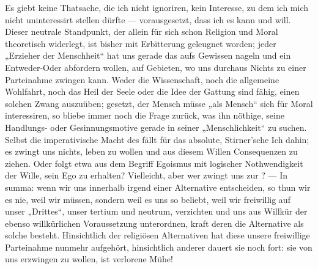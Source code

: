 Es giebt keine Thatsache, die ich nicht ignoriren, kein Interesse, zu dem ich mich nicht uninteressirt stellen dürfte — vorausgesetzt, dass ich es kann und will. Dieser neutrale Standpunkt, der allein für sich schon Religion und Moral theoretisch widerlegt, ist bisher mit Erbitterung geleugnet worden; jeder „Erzieher der Menschheit“ hat uns gerade das  aufs Gewissen nageln und ein Entweder-Oder abfordern wollen, auf Gebieten, wo uns durchaus Nichts zu einer Parteinahme zwingen kann. Weder die Wissenschaft, noch die allgemeine Wohlfahrt, noch das Heil der Seele oder die Idee der Gattung sind fähig, einen solchen Zwang auszuüben; gesetzt, der Mensch müsse „als Mensch“ sich für Moral interessiren, so bliebe immer noch die Frage zurück, was ihn nöthige, seine Handlungs- oder Gesinnungsmotive gerade in seiner „Menschlichkeit“ zu suchen. Selbst die imperativische Macht des  fällt für das absolute, Stirner’sche Ich dahin; es zwingt uns nichts, leben zu wollen und aus diesem Willen Consequenzen zu ziehen. Oder folgt etwa aus dem Begriff Egoismus mit logischer Nothwendigkeit der Wille, sein Ego zu erhalten? Vielleicht, aber wer zwingt uns zur ? — In summa: wenn wir uns innerhalb irgend einer Alternative entscheiden, so thun wir es nie, weil wir müssen, sondern weil es uns so beliebt, weil wir freiwillig auf unser „Drittes“, unser tertium und neutrum, verzichten und uns aus Willkür der ebenso willkürlichen Voraussetzung unterordnen, kraft deren die Alternative als solche besteht. Hinsichtlich der religiösen Alternativen hat diese unsere freiwillige Parteinahme nunmehr aufgehört, hinsichtlich anderer dauert sie noch fort: sie von uns erzwingen zu wollen, ist verlorene Mühe!
\par

